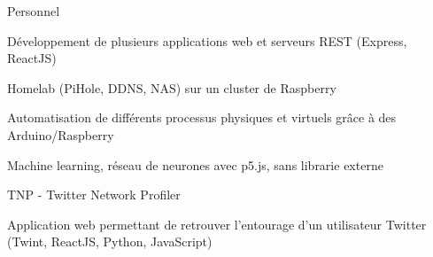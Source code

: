
\begin{cventries}
  \cventry
    {} %
    {Personnel} %
    {} %
    {} %
    {
      \begin{cvitems} %
        \item {Développement de plusieurs applications web et serveurs REST (Express, ReactJS)}
        \item {Homelab (PiHole, DDNS, NAS) sur un cluster de Raspberry}
		\item {Automatisation de différents processus physiques et virtuels grâce à des Arduino/Raspberry}
        \item {Machine learning, réseau de neurones avec p5.js, sans librarie externe}
      \end{cvitems}
    }

  \cventry
    {} %
    {TNP - Twitter Network Profiler} %
    {} %
    {} %
    {
      \begin{cvitems} %
      	\item {Application web permettant de retrouver l'entourage d'un utilisateur Twitter (Twint, ReactJS, Python, JavaScript)}
      \end{cvitems}
    }
\end{cventries}